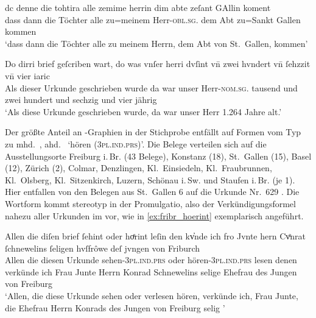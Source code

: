 \begin{exe}
\ex \label{ex:herrin}
	\begin{xlist}
	\ex\label{ex:stg_herrin}
		\setlength{\glossglue}{5pt plus 2pt minus 1pt}
		\gll dc denne die tohtira alle zemime herrin dim abte zeſant GAllin
				koment\\
			dass dann die Töchter alle zu=meinem Herr-\textsc{obl.sg.\MascM}
				dem Abt zu=Sankt Gallen kommen \\
		\trans `dass dann die Töchter alle zu meinem Herrn, dem Abt von
			St.~Gallen, kommen'
			\parencites(Nr.~628, St.~Gallen, 1284)[56,34]{cao2}

	\ex\label{ex:col_herri}
		\gll Do dirri brief geſcriben wart, do was vnſer herri dvſint vn̄ zwei
				hvndert vn̄ ſehzzit vn̄ vier iaric \\
			Als dieser Urkunde geschrieben wurde da war unser
				Herr-\textsc{nom.sg.\MascM} tausend und zwei hundert und
				sechzig und vier jährig \\
		\trans `Als diese Urkunde geschrieben wurde, da war unser Herr
			1.264 Jahre alt.'
			\parencites(Nr.~N~53, Colmar, 1264)[37,15]{cao5}
\end{xlist}
\end{exe}

Der größte Anteil an -Graphien in der Stichprobe entfällt auf Formen vom
Typ  zu mhd.~, ahd.~ `hören
(\textsc{3pl.ind.prs})'. Die Belege verteilen sich auf die Ausstellungsorte
Freiburg i.\,Br. (43 Belege), Konstanz (18), St.~Gallen (15), Basel (12),
Zürich (2), Colmar, Denzlingen, Kl.~Einsiedeln, Kl.~Fraubrunnen, Kl.~Olsberg,
Kl.~Sitzenkirch, Luzern, Schönau i.\,Sw. und Staufen i.\,Br. (je 1). Hier
entfallen von den Belegen aus St.~Gallen 6 auf die Urkunde Nr.~629
\autocites(St.~Gallen, 1284)[57,9--57,35]{cao2}. Die Wortform 
kommt stereotyp in der Promulgatio, also der Verkündigungsformel nahezu aller
Urkunden im  vor, wie in \cref{ex:fribr_hoerint} exemplarisch
angeführt.

\begin{exe}
\ex\label{ex:fribr_hoerint}
	\setlength{\glossglue}{5pt plus 2pt minus 2pt}
	\gll Allen die diſen brief ſehint oder hoͤrint leſin den kv̓nde ich fro
			Jvnte hern Cvͦnrat ſchnewelins ſeligen hvſfrôwe deſ jvngen von
			Friburch \textelp{} \\
		Allen die diesen Urkunde sehen-\textsc{3pl.ind.prs} oder
			hören-\textsc{3pl.ind.prs} lesen denen verkünde ich Frau Junte Herrn
			Konrad Schnewelins selige Ehefrau des Jungen von Freiburg \\
	\trans `Allen, die diese Urkunde sehen oder verlesen hören, verkünde
		ich, Frau Junte, die Ehefrau Herrn Konrads des Jungen von Freiburg
		selig \textelp{}'
		\parencites(Nr.~328, Freiburg i.\,Br., 1277)[314,33--34]{cao1}
\end{exe}

